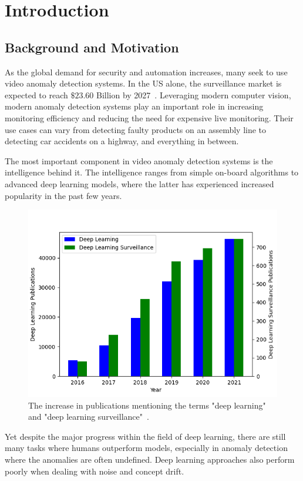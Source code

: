\chapter{Introduction}
\label{sec:introduction}
\section{Background and Motivation}
As the global demand for security and automation increases, many seek to use video anomaly detection systems. In the US alone, the surveillance market is expected to reach $\$23.60$ Billion by 2027~\cite{us_video_stats}. Leveraging modern computer vision, modern anomaly detection systems play an important role in increasing monitoring efficiency and reducing the need for expensive live monitoring. Their use cases can vary from detecting faulty products on an assembly line to detecting car accidents on a highway, and everything in between.
\par
The most important component in video anomaly detection systems is the intelligence behind it. The intelligence ranges from simple on-board algorithms to advanced deep learning models, where the latter has experienced increased popularity in the past few years.\par
\begin{figure}[H]
    \centering
    \includegraphics[width=\linewidth]{resources/introduction/publications_graph.png}
    \caption{The increase in publications mentioning the terms "deep learning" and "deep learning surveillance"~\cite{deep_learning_surveillance_stats}.}
\end{figure}
Yet despite the major progress within the field of deep learning, there are still many tasks where humans outperform models, especially in anomaly detection where the anomalies are often undefined. Deep learning approaches also perform poorly when dealing with noise and concept drift.
